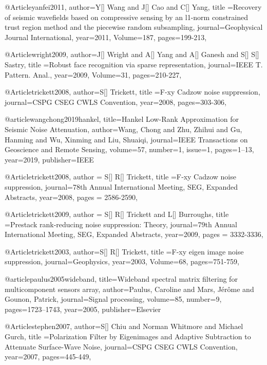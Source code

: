 @Article{yanfei2011,
  author={Y[] Wang and J[] Cao and C[] Yang},
  title ={Recovery of seismic wavefields based on compressive sensing by an l1-norm constrained trust region method and the piecewise random subsampling},
  journal={Geophysical Journal International},
  year=2011,
  Volume=187,
  pages={199-213},
}

@Article{wright2009,
  author={J[] Wright and A[] Yang and A[] Ganesh and S[] S[] Sastry},
  title ={Robust face recognition via sparse representation},
  journal={IEEE T. Pattern. Anal.},
  year=2009,
  Volume=31,
  pages={210-227},
}

@Article{trickett2008,
  author={S[] Trickett},
  title ={{F}-xy Cadzow noise suppression},
  journal={CSPG CSEG CWLS Convention},
  year=2008,
  pages={303-306},
}

@article{wangchong2019hankel,
  title={Hankel Low-Rank Approximation for Seismic Noise Attenuation},
  author={Wang, Chong and Zhu, Zhihui and Gu, Hanming and Wu, Xinming and Liu, Shuaiqi},
  journal={IEEE Transactions on Geoscience and Remote Sensing},
  volume=57,
  number={1},
  issue=1,
  pages={1--13},
  year={2019},
  publisher={IEEE}
}

@Article{trickett2008,
  author = {S[] R[] Trickett},
  title ={F‐xy Cadzow noise suppression},
  journal={78th Annual International Meeting, SEG, Expanded Abstracts},
  year=2008,
  pages = {2586-2590},
}

@Article{trickett2009,
  author = {S[] R[] Trickett and L[] Burroughs},
  title ={Prestack rank-reducing noise suppression: Theory},
  journal={79th Annual International Meeting, SEG, Expanded Abstracts},
  year=2009,
  pages = {3332-3336},
}

@Article{trickett2003,
  author={S[] R[] Trickett},
  title ={F-xy eigen image noise suppression},
  journal={Geophysics},
  year=2003,
  Volume=68,
  pages={751-759},
}

@article{paulus2005wideband,
  title={Wideband spectral matrix filtering for multicomponent sensors array},
  author={Paulus, Caroline and Mars, J{\'e}r{\^o}me and Gounon, Patrick},
  journal={Signal processing},
  volume={85},
  number={9},
  pages={1723--1743},
  year={2005},
  publisher={Elsevier}
}


@Article{stephen2007,
  author={S[] Chiu and Norman Whitmore and Michael Gurch},
  title ={Polarization Filter by Eigenimages and Adaptive Subtraction to Attenuate Surface-Wave Noise},
  journal={CSPG CSEG CWLS Convention},
  year=2007,
  pages={445-449},
}

